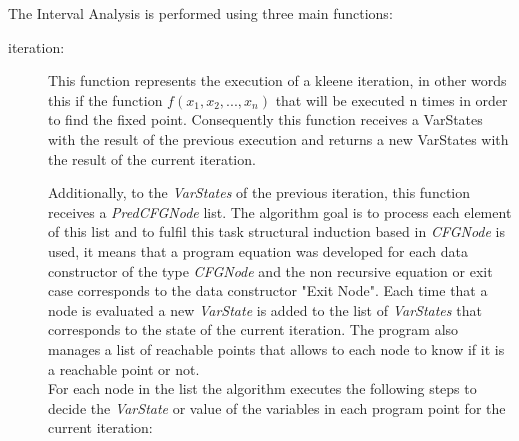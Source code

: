 \documentclass{article}
\begin{document}
The Interval Analysis is performed using three main functions:

\begin{description}
  \item[iteration:] This function represents the execution of a kleene iteration, in other words
    this if the function $ f(x_{1},x_{2},...,x_{n}) $ that will be executed n times in order to find the fixed
    point. Consequently this function receives a VarStates with the result of the previous
    execution and returns a new VarStates with the result of the current iteration.

    Additionally, to the \emph{VarStates} of the previous iteration, this function receives a
    \emph{ PredCFGNode } list. The algorithm goal is to process each element of this list and to fulfil this
    task structural induction based in \emph{ CFGNode } is used, it means that a program equation
    was developed for each data constructor of the type \emph{ CFGNode } and the non recursive
    equation or exit case corresponds to the data constructor "Exit Node". 
    Each time that a node is evaluated a new \emph{VarState} is added to the list of \emph{VarStates} that corresponds
    to the state of the current iteration. The program also manages a list of reachable points that allows to each node to know
    if it is a reachable point or not.	
    \\

    For each node in the list the algorithm executes the following steps to decide the \emph{VarState} or value of the variables in each program point for the current iteration:


\end{description}
\end{document}
